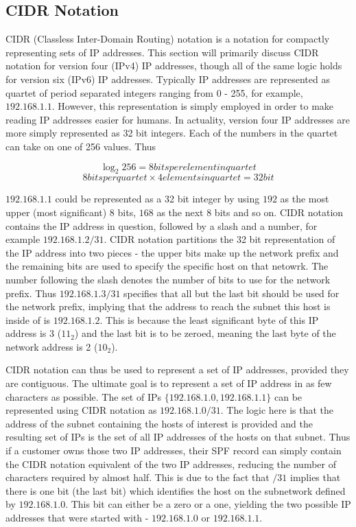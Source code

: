 \subsection{CIDR Notation} \label{sec:CIDR}
CIDR (Classless Inter-Domain Routing) notation is a notation for compactly representing sets of IP addresses. This section will primarily discuss CIDR notation for version four (IPv4) IP addresses, though all of the same logic holds for version six (IPv6) IP addresses. Typically IP addresses are represented as quartet of period separated integers ranging from 0 - 255, for example, $192.168.1.1$. However, this representation is simply employed in order to make reading IP addresses easier for humans. In actuality, version four IP addresses are more simply represented as 32 bit integers. Each of the numbers in the quartet can take on one of 256 values. Thus

\begin{equation}
\log_2 256 = 8 bits per element in quartet
\end{equation}
\begin{equation}
8 bits per quartet \times 4 elements in quartet = 32 bit  
\end{equation}



$192.168.1.1$ could be represented as a 32 bit integer by using $192$ as the most upper (most significant) 8 bits, $168$ as the next 8 bits and so on. CIDR notation contains the IP address in question, followed by a slash and a number, for example $192.168.1.2/31$. CIDR notation partitions the 32 bit representation of the IP address into two pieces - the upper bits make up the network prefix and the remaining bits are used to specify the specific host on that netowrk. The number following the slash denotes the number of bits to use for the network prefix. Thus $192.168.1.3/31$ specifies that all but the last bit should be used for the network prefix, implying that the address to reach the subnet this host is inside of is $192.168.1.2$. This is because the least significant byte of this IP address is 3 ($11_2$) and the last bit is to be zeroed, meaning the last byte of the network address is 2 ($10_2$). 

CIDR notation can thus be used to represent a set of IP addresses, provided they are contiguous. The ultimate goal is to represent a set of IP address in as few characters as possible. The set of IPs $\{192.168.1.0, 192.168.1.1\}$ can be represented using CIDR notation as $192.168.1.0/31$. The logic here is that the address of the subnet containing the hosts of interest is provided and the resulting set of IPs is the set of all IP addresses of the hosts on that subnet.  Thus if a customer owns those two IP addresses, their SPF record can simply contain the CIDR notation equivalent of the two IP addresses, reducing the number of characters required by almost half. This is due to the fact that $/31$ implies that there is one bit (the last bit) which identifies the host on the subnetwork defined by $192.168.1.0$. This bit can either be a zero or a one, yielding the two possible IP addresses that were started with - $192.168.1.0$ or $192.168.1.1$.


